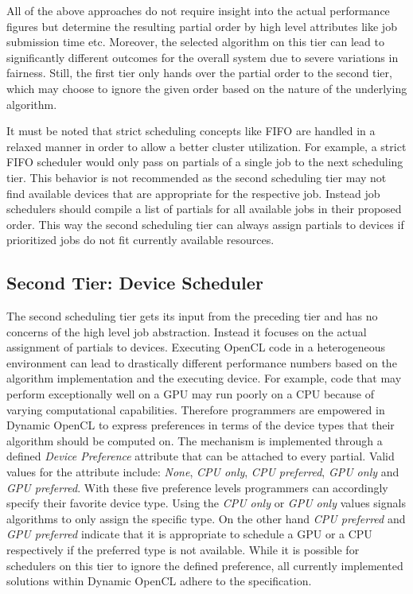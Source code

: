 All of the above approaches do not require insight into the actual performance figures but determine the resulting partial order by high level attributes like job submission time etc. Moreover, the selected algorithm on this tier can lead to significantly different outcomes for the overall system due to severe variations in fairness. Still, the first tier only hands over the partial order to the second tier, which may choose to ignore the given order based on the nature of the underlying algorithm.

It must be noted that strict scheduling concepts like FIFO are handled in a relaxed manner in order to allow a better cluster utilization. For example, a strict FIFO scheduler would only pass on partials of a single job to the next scheduling tier. This behavior is not recommended as the second scheduling tier may not find available devices that are appropriate for the respective job. Instead job schedulers should compile a list of partials for all available jobs in their proposed order. This way the second scheduling tier can always assign partials to devices if prioritized jobs do not fit currently available resources.

\subsection{Second Tier: Device Scheduler}
The second scheduling tier gets its input from the preceding tier and has no concerns of the high level job abstraction. Instead it focuses on the actual assignment of partials to devices. Executing OpenCL code in a heterogeneous environment can lead to drastically different performance numbers based on the algorithm implementation and the executing device. For example, code that may perform exceptionally well on a GPU may run poorly on a CPU because of varying computational capabilities. Therefore programmers are empowered in Dynamic OpenCL to express preferences in terms of the device types that their algorithm should be computed on. The mechanism is implemented through a defined \textit{Device Preference} attribute that can be attached to every partial. Valid values for the attribute include: \textit{None}, \textit{CPU only}, \textit{CPU preferred}, \textit{GPU only} and \textit{GPU preferred}. With these five preference levels programmers can accordingly specify their favorite device type. Using the \textit{CPU only} or \textit{GPU only} values signals algorithms to only assign the specific type. On the other hand \textit{CPU preferred} and \textit{GPU preferred} indicate that it is appropriate to schedule a GPU or a CPU respectively if the preferred type is not available. While it is possible for schedulers on this tier to ignore the defined preference, all currently implemented solutions within Dynamic OpenCL adhere to the specification.

